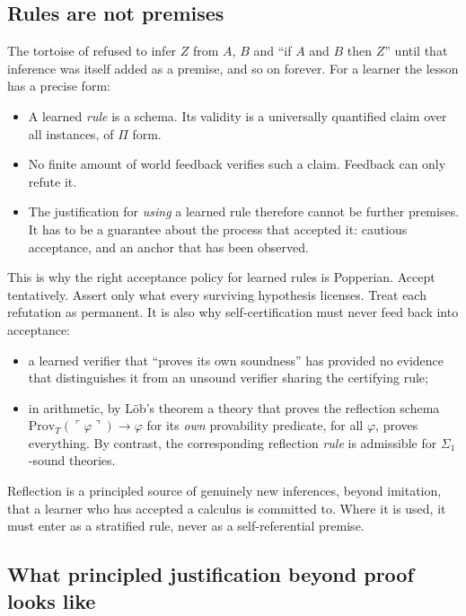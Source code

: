 \subsection{Rules are not premises}\label{sec:philosophy:carroll}

The tortoise of \citet{carroll1895tortoise} refused to infer $Z$ from $A$, $B$ and ``if $A$ and $B$ then $Z$'' until that inference was itself added as a premise, and so on forever. For a learner the lesson has a precise form:
\begin{itemize}
\item A learned \emph{rule} is a schema. Its validity is a universally quantified claim over all instances, of $\Pi$ form.
\item No finite amount of world feedback verifies such a claim. Feedback can only refute it.
\item The justification for \emph{using} a learned rule therefore cannot be further premises. It has to be a guarantee about the process that accepted it: cautious acceptance, and an anchor that has been observed.
\end{itemize}
This is why the right acceptance policy for learned rules is Popperian. Accept tentatively. Assert only what every surviving hypothesis licenses. Treat each refutation as permanent. It is also why self-certification must never feed back into acceptance:
\begin{itemize}
\item a learned verifier that ``proves its own soundness'' has provided no evidence that distinguishes it from an unsound verifier sharing the certifying rule;
\item in arithmetic, by Löb's theorem a theory that proves the reflection schema $\mathrm{Prov}_T(\ulcorner\varphi\urcorner)\to\varphi$ for its \emph{own} provability predicate, for all $\varphi$, proves everything. By contrast, the corresponding reflection \emph{rule} is admissible for $\Sigma_1$-sound theories.
\end{itemize}
Reflection is a principled source of genuinely new inferences, beyond imitation, that a learner who has accepted a calculus is committed to. Where it is used, it must enter as a stratified rule, never as a self-referential premise.

\subsection{What principled justification beyond proof looks like}\label{sec:philosophy:shape}

